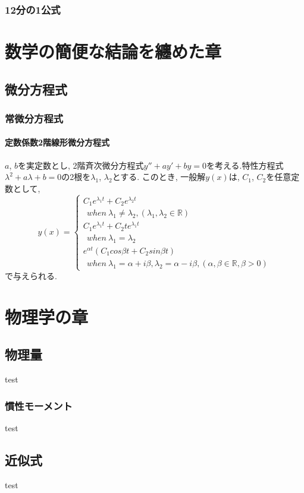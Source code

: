 \documentclass[]{jreport}
\begin{document}
\section{12分の1公式}

\part{数学の簡便な結論を纏めた章}
\chapter{微分方程式}
\section{常微分方程式}
\subsection{定数係数2階線形微分方程式}

$a$, $b$を実定数とし, 2階斉次微分方程式$y''+ay'+by=0$を考える.特性方程式$\lambda^2+a\lambda+b=0$の2根を$\lambda_{1}$, $\lambda_{2}$とする. このとき, 一般解$y(x)$は, $C_{1}$, $C_{2}$を任意定数として, \\
\begin{equation}
    y(x)= \left \{
        \begin{array}{l}
            C_{1}e^{\lambda_{1} t}+C_{2}e^{\lambda_{2} t}\\
            \ \ when \ \lambda_{1}\neq\lambda_{2}, (\lambda_{1}, \lambda_{2}\in\mathbb{R}) \\
            C_{1}e^{\lambda_{1} t}+C_{2}te^{\lambda_{1} t}\\
            \ \ when \ \lambda_{1}=\lambda_{2} \\
            e^{\alpha t}(C_{1}cos{\beta t}+C_{2}sin{\beta t}) \\
            \ \ when \ \lambda_{1}=\alpha+{i\beta}, \lambda_{2}=\alpha-{i\beta}, (\alpha, \beta\in\mathbb{R}, \beta>0)
        \end{array}
    \right.
\end{equation}
で与えられる.

\part{物理学の章}
\chapter{物理量}

test

\section{慣性モーメント}

test

\chapter{近似式}

test
\end{document}
